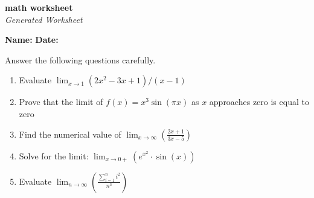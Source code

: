 \documentclass{article}
\begin{document}
\begin{center}
    \Huge \textbf{ math worksheet } \\[0.5cm]
    \large \textit{Generated Worksheet}
\end{center}

\vspace{1cm}

\noindent \textbf{Name:} \underline{\hspace{6cm}} \hfill \textbf{Date:} \underline{\hspace{4cm}}

\vspace{1cm}

Answer the following questions carefully.

\vspace{0.5cm}

\begin{enumerate}
\item Evaluate $\displaystyle \lim_{x \to 1} (2x^2 - 3x + 1) / (x - 1)$ \vspace{2cm} \item Prove that the limit of $f(x) = x^3 \sin(\pi x)$ as $x$ approaches zero is equal to zero \vspace{2cm} \item Find the numerical value of $\displaystyle \lim_{x \to \infty} (\frac{2x + 1}{3x - 5})$ \vspace{2cm} \item Solve for the limit: $ \lim_{x \to 0+} (e^{x^2} \cdot \sin(x)) $ \vspace{2cm} \item Evaluate $\displaystyle \lim_{n \to \infty} (\frac{\sum_{i=1}^{n} i^2}{n^3})$ \vspace{2cm}
\end{enumerate}
\end{document}
